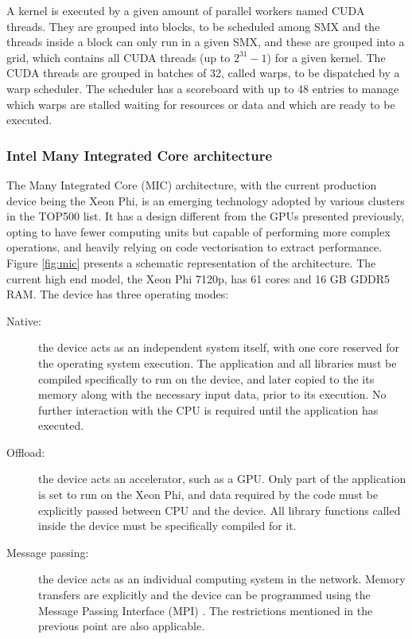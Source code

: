 A kernel is executed by a given amount of parallel workers named CUDA threads. They are grouped into blocks, to be scheduled among SMX and the threads inside a block can only run in a given SMX, and these are grouped into a grid, which contains all CUDA threads (up to $2^{31}-1$) for a given kernel. The CUDA threads are grouped in batches of 32, called warps, to be dispatched by a warp scheduler. The scheduler has a scoreboard with up to 48 entries to manage which warps are stalled waiting for resources or data and which are ready to be executed.

\subsubsection*{Intel Many Integrated Core architecture}
\label{mic}

The \intel Many Integrated Core (MIC) architecture, with the current production device being the \intel Xeon Phi, is an emerging technology adopted by various clusters in the TOP500 list. It has a design different from the \nvidia GPUs presented previously, opting to have fewer computing units but capable of performing more complex operations, and heavily relying on code vectorisation to extract performance. Figure \ref{fig:mic} presents a schematic representation of the architecture. The current high end model, the \intel Xeon Phi 7120p, has 61 cores and 16 GB GDDR5 RAM. The device has three operating modes:

\begin{description}
	\item[Native:] the device acts as an independent system itself, with one core reserved for the operating system execution. The application and all libraries must be compiled specifically to run on the device, and later copied to the its memory along with the necessary input data, prior to its execution. No further interaction with the CPU is required until the application has executed.
	\item[Offload:] the device acts an accelerator, such as a GPU. Only part of the application is set to run on the Xeon Phi, and data required by the code must be explicitly passed between CPU and the device. All library functions called inside the device must be specifically compiled for it.
	\item[Message passing:] the device acts as an individual computing system in the network. Memory transfers are explicitly and the device can be programmed using the Message Passing Interface (MPI) \cite{MPI}. The restrictions mentioned in the previous point are also applicable.
\end{description}

